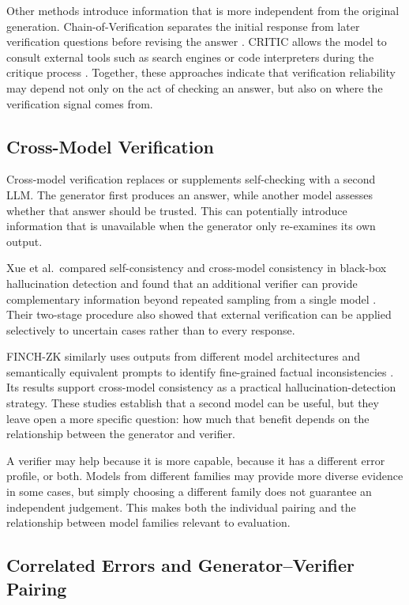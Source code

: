 \documentclass[11pt,a4paper]{article}
\begin{document}
	Other methods introduce information that is more independent from the original generation. Chain-of-Verification separates the initial response from later verification questions before revising the answer \cite{dhuliawala2024chain}. CRITIC allows the model to consult external tools such as search engines or code interpreters during the critique process \cite{gou2024critic}. Together, these approaches indicate that verification reliability may depend not only on the act of checking an answer, but also on where the verification signal comes from.
	
	\subsection{Cross-Model Verification}
	
	Cross-model verification replaces or supplements self-checking with a second LLM. The generator first produces an answer, while another model assesses whether that answer should be trusted. This can potentially introduce information that is unavailable when the generator only re-examines its own output.
	
	Xue et al.\ compared self-consistency and cross-model consistency in black-box hallucination detection and found that an additional verifier can provide complementary information beyond repeated sampling from a single model \cite{xue2025verify}. Their two-stage procedure also showed that external verification can be applied selectively to uncertain cases rather than to every response.
	
	FINCH-ZK similarly uses outputs from different model architectures and semantically equivalent prompts to identify fine-grained factual inconsistencies \cite{goel2025zero}. Its results support cross-model consistency as a practical hallucination-detection strategy. These studies establish that a second model can be useful, but they leave open a more specific question: how much that benefit depends on the relationship between the generator and verifier.
	
	A verifier may help because it is more capable, because it has a different error profile, or both. Models from different families may provide more diverse evidence in some cases, but simply choosing a different family does not guarantee an independent judgement. This makes both the individual pairing and the relationship between model families relevant to evaluation.
	
	\subsection{Correlated Errors and Generator--Verifier Pairing}
	
\end{document}
